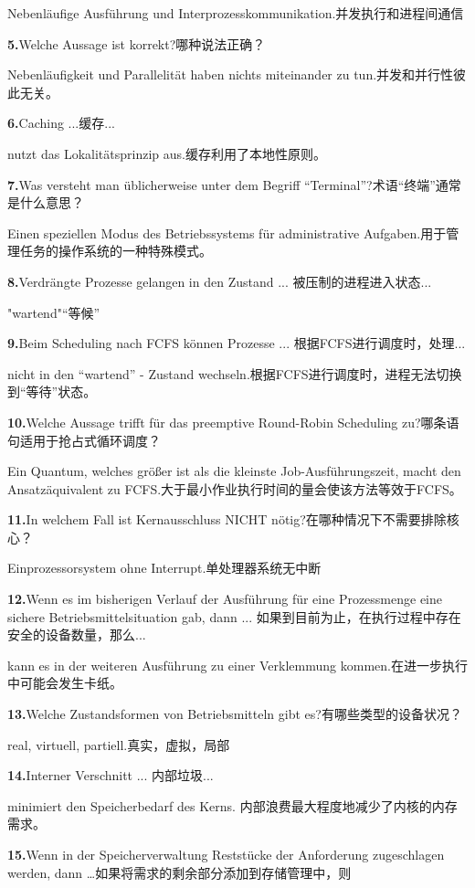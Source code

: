 \documentclass[fleqn]{article}
\begin{document}
Nebenläufige Ausführung und Interprozesskommunikation.并发执行和进程间通信

\textbf{5.}Welche Aussage ist korrekt?哪种说法正确？

Nebenläufigkeit und Parallelität haben nichts miteinander zu tun.并发和并行性彼此无关。

\textbf{6.}Caching ...缓存...

nutzt das Lokalitätsprinzip aus.缓存利用了本地性原则。

\textbf{7.}Was versteht man üblicherweise unter dem Begriff “Terminal”?术语“终端”通常是什么意思？

Einen speziellen Modus des Betriebssystems für administrative Aufgaben.用于管理任务的操作系统的一种特殊模式。

\textbf{8.}Verdrängte Prozesse gelangen in den Zustand ... 被压制的进程进入状态...

"wartend"“等候”

\textbf{9.}Beim Scheduling nach FCFS können Prozesse ... 根据FCFS进行调度时，处理...

nicht in den “wartend” - Zustand wechseln.根据FCFS进行调度时，进程无法切换到“等待”状态。

\textbf{10.}Welche Aussage trifft für das preemptive Round-Robin Scheduling zu?哪条语句适用于抢占式循环调度？

Ein Quantum, welches größer ist als die kleinste Job-Ausführungszeit, macht den Ansatzäquivalent zu FCFS.大于最小作业执行时间的量会使该方法等效于FCFS。

\textbf{11.}In welchem Fall ist Kernausschluss NICHT nötig?在哪种情况下不需要排除核心？

Einprozessorsystem ohne Interrupt.单处理器系统无中断

\textbf{12.}Wenn es im bisherigen Verlauf der Ausführung für eine Prozessmenge eine sichere Betriebsmittelsituation gab, dann ... 如果到目前为止，在执行过程中存在安全的设备数量，那么...

kann es in der weiteren Ausführung zu einer Verklemmung kommen.在进一步执行中可能会发生卡纸。

\textbf{13.}Welche Zustandsformen von Betriebsmitteln gibt es?有哪些类型的设备状况？

real, virtuell, partiell.真实，虚拟，局部

\textbf{14.}Interner Verschnitt ...  内部垃圾...

minimiert den Speicherbedarf des Kerns. 内部浪费最大程度地减少了内核的内存需求。

\textbf{15.}Wenn in der Speicherverwaltung Reststücke der Anforderung zugeschlagen werden, dann \dots 如果将需求的剩余部分添加到存储管理中，则
\end{document}
